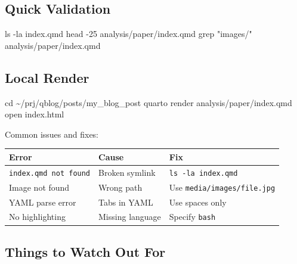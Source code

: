\documentclass[
  letterpaper,
  DIV=11,
  numbers=noendperiod]{scrartcl}
\newenvironment{Shaded}{\begin{snugshade}}{\end{snugshade}}
\newcommand{\AttributeTok}[1]{\textcolor[rgb]{0.40,0.45,0.13}{#1}}
\newcommand{\BuiltInTok}[1]{\textcolor[rgb]{0.00,0.23,0.31}{#1}}
\newcommand{\ExtensionTok}[1]{\textcolor[rgb]{0.00,0.23,0.31}{#1}}
\newcommand{\FunctionTok}[1]{\textcolor[rgb]{0.28,0.35,0.67}{#1}}
\newcommand{\NormalTok}[1]{\textcolor[rgb]{0.00,0.23,0.31}{#1}}
\newcommand{\StringTok}[1]{\textcolor[rgb]{0.13,0.47,0.30}{#1}}
\newcounter{none} %
\begin{document}
\subsection{Quick Validation}\label{quick-validation}

\begin{Shaded}
\begin{Highlighting}[]
\FunctionTok{ls} \AttributeTok{{-}la}\NormalTok{ index.qmd}
\FunctionTok{head} \AttributeTok{{-}25}\NormalTok{ analysis/paper/index.qmd}
\FunctionTok{grep} \StringTok{"images/"}\NormalTok{ analysis/paper/index.qmd}
\end{Highlighting}
\end{Shaded}

\subsection{Local Render}\label{local-render}

\begin{Shaded}
\begin{Highlighting}[]
\BuiltInTok{cd}\NormalTok{ \textasciitilde{}/prj/qblog/posts/my\_blog\_post}
\ExtensionTok{quarto}\NormalTok{ render analysis/paper/index.qmd}
\ExtensionTok{open}\NormalTok{ index.html}
\end{Highlighting}
\end{Shaded}

Common issues and fixes:

{\def\LTcaptype{none} %
\begin{longtable}[]{@{}lll@{}}
\toprule\noalign{}
Error & Cause & Fix \\
\midrule\noalign{}
\endhead
\bottomrule\noalign{}
\endlastfoot
\texttt{index.qmd\ not\ found} & Broken symlink &
\texttt{ls\ -la\ index.qmd} \\
Image not found & Wrong path & Use \texttt{media/images/file.jpg} \\
YAML parse error & Tabs in YAML & Use spaces only \\
No highlighting & Missing language & Specify
\texttt{\textasciigrave{}\textasciigrave{}\textasciigrave{}bash} \\
\end{longtable}
}

\subsection{Things to Watch Out For}\label{things-to-watch-out-for}
\end{document}
